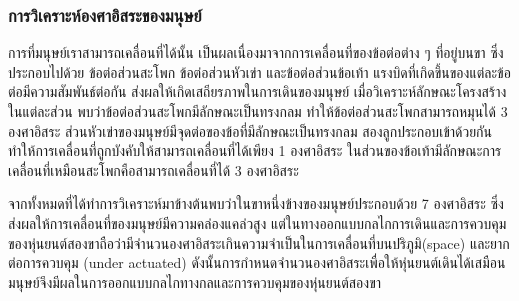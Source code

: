 \subsubsection{การวิเคราะห์องศาอิสระของมนุษย์}
การที่มนุษย์เราสามารถเคลื่อนที่ได้นั้น เป็นผลเนื่องมาจากการเคลื่อนที่ของข้อต่อต่าง ๆ ที่อยู่บนขา ซึ่งประกอบไปด้วย ข้อต่อส่วนสะโพก ข้อต่อส่วนหัวเข่า และข้อต่อส่วนข้อเท้า
แรงบิดที่เกิดขึ้นของแต่ละข้อต่อมีความสัมพันธ์ต่อกัน ส่งผลให้เกิดเสถียรภาพในการเดินของมนุษย์
เมื่อวิเคราะห์ลักษณะโครงสร้างในแต่ละส่วน พบว่าข้อต่อส่วนสะโพกมีลักษณะเป็นทรงกลม 
ทำให้ข้อต่อส่วนสะโพกสามารถหมุนได้ 3 องศาอิสระ ส่วนหัวเข่าของมนุษย์มีจุดต่อของข้อที่มีลักษณะเป็นทรงกลม
สองลูกประกอบเข้าด้วยกันทำให้การเคลื่อนที่ถูกบังคับให้สามารถเคลื่อนที่ได้เพียง 1 องศาอิสระ
ในส่วนของข้อเท้ามีลักษณะการเคลื่อนที่เหมือนสะโพกคือสามารถเคลื่อนที่ได้ 3 องศาอิสระ

จากทั้งหมดที่ได้ทำการวิเคราะห์มาข้างต้นพบว่าในขาหนึ่งข้างของมนุษย์ประกอบด้วย 7 องศาอิสระ
ซึ่งส่งผลให้การเคลื่อนที่ของมนุษย์มีความคล่องแคล่วสูง แต่ในทางออกแบบกลไกการเดินและการควบคุม
ของหุ่นยนต์สองขาถือว่ามีจำนวนองศาอิสระเกินความจำเป็นในการเคลื่อนที่บนปริภูมิ(space) และยากต่อการควบคุม
(under actuated) ดังนั้นการกำหนดจำนวนองศาอิสระเพื่อให้หุ่นยนต์เดินได้เสมือนมนุษย์จึงมีผลในการออกแบบกลไกทางกลและการควบคุมของหุ่นยนต์สองขา 

